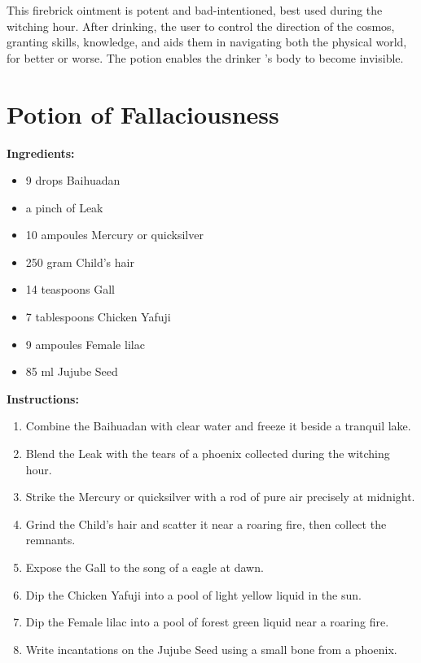 \documentclass{article}
\begin{document}
This firebrick ointment is potent and bad-intentioned, best used during the witching hour. After drinking, the user to control the direction of the cosmos, granting skills, knowledge, and aids them in navigating both the physical world, for better or worse. The potion enables the drinker 's body to become invisible.

\newpage
\section*{Potion of Fallaciousness}

\textbf{Ingredients:}

\begin{itemize}
  \item 9 drops Baihuadan
  \item a pinch of Leak
  \item 10 ampoules Mercury or quicksilver
  \item 250 gram Child's hair
  \item 14 teaspoons Gall
  \item 7 tablespoons Chicken Yafuji
  \item 9 ampoules Female lilac
  \item 85 ml Jujube Seed
\end{itemize}

\textbf{Instructions:}

\begin{enumerate}
  \item Combine the Baihuadan with clear water and freeze it beside a tranquil lake.
  \item Blend the Leak with the tears of a phoenix collected during the witching hour.
  \item Strike the Mercury or quicksilver with a rod of pure air precisely at midnight.
  \item Grind the Child's hair and scatter it near a roaring fire, then collect the remnants.
  \item Expose the Gall to the song of a eagle at dawn.
  \item Dip the Chicken Yafuji into a pool of light yellow liquid in the sun.
  \item Dip the Female lilac into a pool of forest green liquid near a roaring fire.
  \item Write incantations on the Jujube Seed using a small bone from a phoenix.
\end{enumerate}
\end{document}
